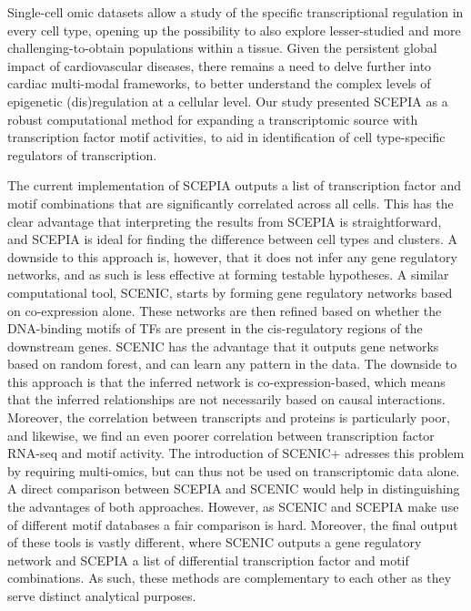 Single-cell omic datasets allow a study of the specific transcriptional regulation in every cell type, opening up the possibility to also explore lesser-studied and more challenging-to-obtain populations within a tissue. Given the persistent global impact of cardiovascular diseases\cite{Tsao2023}, there remains a need to delve further into cardiac multi-modal frameworks, to better understand the complex levels of epigenetic (dis)regulation at a cellular level. Our study presented SCEPIA as a robust computational method for expanding a transcriptomic source with transcription factor motif activities, to aid in identification of cell type-specific regulators of transcription.





The current implementation of SCEPIA outputs a list of transcription factor and motif combinations that are significantly correlated across all cells. This has the clear advantage that interpreting the results from SCEPIA is straightforward, and SCEPIA is ideal for finding the difference between cell types and clusters. A downside to this approach is, however, that it does not infer any gene regulatory networks, and as such is less effective at forming testable hypotheses. A similar computational tool, SCENIC\cite{Aibar_2017}, starts by forming gene regulatory networks based on co-expression alone. These networks are then refined based on whether the DNA-binding motifs of TFs are present in the cis-regulatory regions of the downstream genes. SCENIC has the advantage that it outputs gene networks based on random forest, and can learn any pattern in the data. The downside to this approach is that the inferred network is co-expression-based, which means that the inferred relationships are not necessarily based on causal interactions. Moreover, the correlation between transcripts and proteins is particularly poor\cite{Fortelny2017,Franks2017}, and likewise, we find an even poorer correlation between transcription factor RNA-seq and motif activity. The introduction of SCENIC+\cite{BravoGonzlezBlas2023} adresses this problem by requiring multi-omics, but can thus not be used on transcriptomic data alone. A direct comparison between SCEPIA and SCENIC would help in distinguishing the advantages of both approaches. However, as SCENIC and SCEPIA make use of different motif databases a fair comparison is hard. Moreover, the final output of these tools is vastly different, where SCENIC outputs a gene regulatory network and SCEPIA a list of differential transcription factor and motif combinations. As such, these methods are complementary to each other as they serve distinct analytical purposes.

